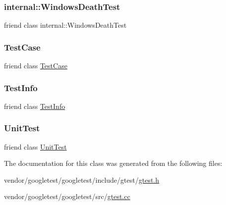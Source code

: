 \subsubsection{\texorpdfstring{internal\+::\+Windows\+Death\+Test}{internal::WindowsDeathTest}}
{\footnotesize\ttfamily friend class internal\+::\+Windows\+Death\+Test\hspace{0.3cm}{\ttfamily [friend]}}

\mbox{\label{classtesting_1_1_test_result_aff779e55b06adfa7c0088bd10253f0f0}} 
\subsubsection{\texorpdfstring{Test\+Case}{TestCase}}
{\footnotesize\ttfamily friend class \hyperlink{classtesting_1_1_test_case}{Test\+Case}\hspace{0.3cm}{\ttfamily [friend]}}

\mbox{\label{classtesting_1_1_test_result_a4c49c2cdb6c328e6b709b4542f23de3c}} 
\subsubsection{\texorpdfstring{Test\+Info}{TestInfo}}
{\footnotesize\ttfamily friend class \hyperlink{classtesting_1_1_test_info}{Test\+Info}\hspace{0.3cm}{\ttfamily [friend]}}

\mbox{\label{classtesting_1_1_test_result_a832b4d233efee1a32feb0f4190b30d39}} 
\subsubsection{\texorpdfstring{Unit\+Test}{UnitTest}}
{\footnotesize\ttfamily friend class \hyperlink{classtesting_1_1_unit_test}{Unit\+Test}\hspace{0.3cm}{\ttfamily [friend]}}



The documentation for this class was generated from the following files\+:\begin{DoxyCompactItemize}
\item 
vendor/googletest/googletest/include/gtest/\hyperlink{gtest_8h}{gtest.\+h}\item 
vendor/googletest/googletest/src/\hyperlink{gtest_8cc}{gtest.\+cc}\end{DoxyCompactItemize}
